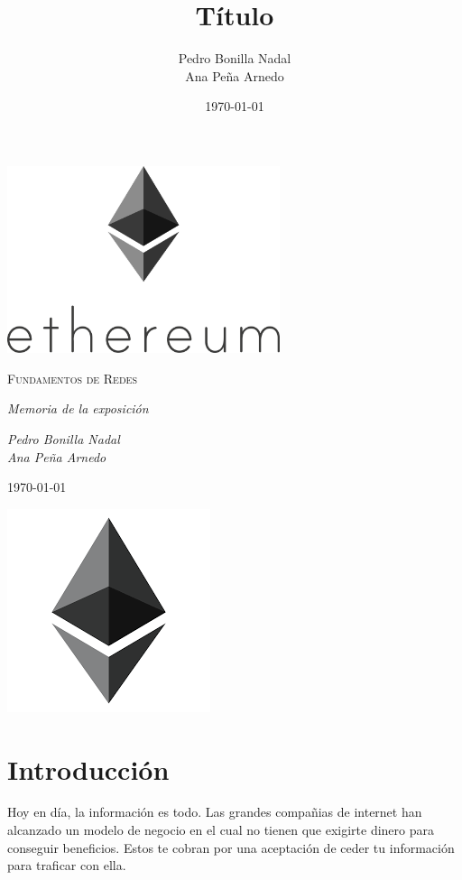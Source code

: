 \documentclass[11pt,a4paper]{article}
\title{Título}
\author{Pedro Bonilla Nadal\\Ana Peña Arnedo}
\date{\today}
\begin{document}
\begin{titlepage}
  \centering
  
  \vspace{10cm}
  \includegraphics[width=0.6\textwidth]{images/portada.png}\par\vspace{1cm}
  {\scshape\large Fundamentos de Redes \par} \vspace{1cm}
  \vspace{0.4cm}
  {\large\itshape Memoria de la exposición\\}
  \vspace{0.6cm}
  {\large\itshape  Pedro Bonilla Nadal\\Ana Peña Arnedo \par} \vspace{1.00cm}

  \vfill
  {\large \today\par}

\end{titlepage}
\begin{center}
	\includegraphics[scale=.42]{images/logo.png}
\end{center}


\section{Introducción}
Hoy en día, la información es todo. Las grandes compañias de internet han alcanzado un modelo  de negocio en el cual no tienen que exigirte dinero para conseguir beneficios. Estos te cobran por una aceptación de ceder tu información para traficar con ella. \\
\end{document}
